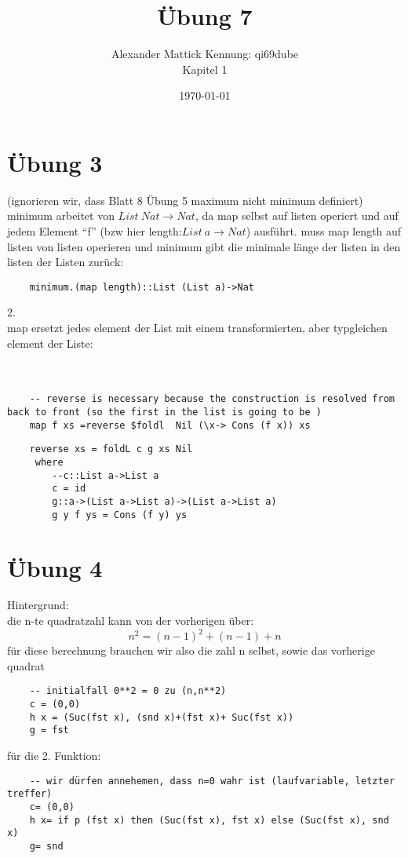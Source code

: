 \documentclass{article}
\author{
Alexander Mattick Kennung: qi69dube\\
Kapitel 1
}
\date{\today}
\title{Übung 7}
\newcommand{\Todo}[1]{\underline{\color{red}{#1}}}
\begin{document}
	\section{Übung 3}
	(ignorieren wir, dass Blatt 8 Übung 5 maximum nicht minimum definiert)\\
	minimum arbeitet von $List\ Nat\to Nat$, da map selbst auf listen operiert und auf jedem Element ``f'' (bzw hier length:$List\ a\to Nat$) ausführt. muss map length auf listen von listen operieren und minimum gibt die minimale länge der listen in den listen der Listen zurück:\\
	\begin{verbatim}
	minimum.(map length)::List (List a)->Nat
	\end{verbatim}
	2.\\
	map ersetzt jedes element der List mit einem transformierten, aber typgleichen element der Liste:\\
	\Todo{benutzen die foldl mit argumentreihenfolge anders herum? MINDFUCK}\\
	\Todo{es gehört $Foldable\ t\Rightarrow (b \to a \to b) \to b \to t a \to b$}\\
	\Todo{UND DAS GLEICHE BEI DER ARGUMENTFUNKTION!!}
	\begin{verbatim}
	-- reverse is necessary because the construction is resolved from back to front (so the first in the list is going to be )
	map f xs =reverse $foldl  Nil (\x-> Cons (f x)) xs
	\end{verbatim}
	\begin{verbatim}
	reverse xs = foldL c g xs Nil
	 where
	 	--c::List a->List a
	 	c = id
	 	g::a->(List a->List a)->(List a->List a)
	 	g y f ys = Cons (f y) ys
	\end{verbatim}
	\section{Übung 4}
	Hintergrund:\\
	die n-te quadratzahl kann von der vorherigen über:\\
	\[n^2 = (n-1)^2+(n-1)+n\]
	für diese berechnung brauchen wir also die zahl n selbst, sowie das vorherige quadrat
	\begin{verbatim}
	-- initialfall 0**2 = 0 zu (n,n**2)
	c = (0,0)
	h x = (Suc(fst x), (snd x)+(fst x)+ Suc(fst x))
	g = fst
	\end{verbatim}
	für die 2. Funktion:
	\begin{verbatim}
	-- wir dürfen annehemen, dass n=0 wahr ist (laufvariable, letzter treffer)
	c= (0,0)
	h x= if p (fst x) then (Suc(fst x), fst x) else (Suc(fst x), snd x)
	g= snd
	\end{verbatim}
\end{document}
